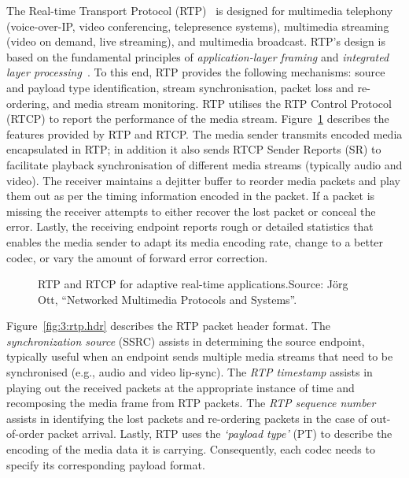 
The Real-time Transport Protocol (RTP)~\cite{rfc3550} is designed for
multimedia telephony (voice-over-IP, video conferencing, telepresence
systems), multimedia streaming (video on demand, live streaming), and
multimedia broadcast. RTP's design is based on the fundamental principles of
\textit {application-layer framing} and \textit{integrated layer
processing}~\cite{clark:alf}. To this end, RTP provides the following
mechanisms: source and payload type identification, stream synchronisation,
packet loss and re-ordering, and media stream monitoring. RTP utilises the RTP
Control Protocol (RTCP) to report the performance of the media stream.
Figure~\ref{fig:3:rtp:model} describes the features provided by RTP and RTCP.
The media sender transmits encoded media encapsulated in RTP; in addition it
also sends RTCP Sender Reports (SR) to facilitate playback synchronisation of
different media streams (typically audio and video). The receiver maintains a
dejitter buffer to reorder media packets and play them out as per the timing
information encoded in the packet. If a packet is missing the receiver attempts
to either recover the lost packet or conceal the error. Lastly, the receiving
endpoint reports rough or detailed statistics that enables the media sender to
adapt its media encoding rate, change to a better codec, or vary the amount of
forward error correction.

\begin{figure}[!t]
\caption{RTP and RTCP for adaptive real-time applications.{\scriptsize Source:
J\"org Ott, ``Networked Multimedia Protocols and Systems''}.}
\label{fig:3:rtp:model}
\end{figure}

Figure~\ref{fig:3:rtp.hdr} describes the RTP packet header format. The
\textit{synchronization source} (SSRC) assists in determining the source
endpoint, typically useful when an endpoint sends multiple media streams that
need to be synchronised (e.g., audio and video lip-sync). The \textit{RTP
timestamp} assists in playing out the received packets at the appropriate
instance of time and recomposing the media frame from RTP packets. The
\textit{RTP sequence number} assists in identifying the lost packets and
re-ordering packets in the case of out-of-order packet arrival. Lastly, RTP uses
the \textit{`payload type'} (PT) to describe the encoding of the media data it is
carrying. Consequently, each codec needs to specify its corresponding payload
format.

